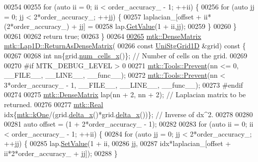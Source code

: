 \begin{DoxyCode}
00254 
00255   \textcolor{keywordflow}{for} (\textcolor{keyword}{auto} ii = 0; ii < order\_accuracy\_ - 1; ++ii) \{
00256     \textcolor{keywordflow}{for} (\textcolor{keyword}{auto} jj = 0; jj < 2*order\_accuracy\_; ++jj) \{
00257       laplacian\_[offset + ii*(2*order\_accuracy\_) + jj] =
00258         lap.\hyperlink{classmtk_1_1DenseMatrix_a87fb785713c04b13767947cc3325ce7c}{GetValue}(1 + ii,jj);
00259     \}
00260   \}
00261 
00262   \textcolor{keywordflow}{return} \textcolor{keyword}{true};
00263 \}
00264 
\hypertarget{mtk__lap__1d_8cc_source_l00265}{}\hyperlink{classmtk_1_1Lap1D_aaea34a17b0879e05eb4109645a2ba8f4}{00265} \hyperlink{classmtk_1_1DenseMatrix}{mtk::DenseMatrix} \hyperlink{classmtk_1_1Lap1D_aaea34a17b0879e05eb4109645a2ba8f4}{mtk::Lap1D::ReturnAsDenseMatrix}(
00266   \textcolor{keyword}{const} \hyperlink{classmtk_1_1UniStgGrid1D}{UniStgGrid1D} &grid)\textcolor{keyword}{ const }\{
00267 
00268   \textcolor{keywordtype}{int} nn\{grid.\hyperlink{classmtk_1_1UniStgGrid1D_af1b3729d8afa07be5b2775ed68015b80}{num\_cells\_x}()\};  \textcolor{comment}{// Number of cells on the grid.}
00269 
00270 \textcolor{preprocessor}{  #if MTK\_DEBUG\_LEVEL > 0}
00271   \hyperlink{classmtk_1_1Tools_afe5bb096309258e2e72503fd7b41c7e0}{mtk::Tools::Prevent}(nn <= 0, \_\_FILE\_\_, \_\_LINE\_\_, \_\_func\_\_);
00272   \hyperlink{classmtk_1_1Tools_afe5bb096309258e2e72503fd7b41c7e0}{mtk::Tools::Prevent}(nn < 3*order\_accuracy\_ - 1, \_\_FILE\_\_, \_\_LINE\_\_, \_\_func\_\_);
00273 \textcolor{preprocessor}{  #endif}
00274 
00275   \hyperlink{classmtk_1_1DenseMatrix}{mtk::DenseMatrix} lap(nn + 2, nn + 2); \textcolor{comment}{// Laplacian matrix to be returned.}
00276 
00277   \hyperlink{group__c01-roots_gac080bbbf5cbb5502c9f00405f894857d}{mtk::Real} idx\{\hyperlink{group__c01-roots_ga26407c24d43b6b95480943340d285c71}{mtk::kOne}/(grid.\hyperlink{classmtk_1_1UniStgGrid1D_a6e7173b01241632cf509496d66b9f74c}{delta\_x}()*grid.\hyperlink{classmtk_1_1UniStgGrid1D_a6e7173b01241632cf509496d66b9f74c}{delta\_x}())\}; \textcolor{comment}{// Inverse of
       dx^2.}
00278 
00280 
00281   \textcolor{keyword}{auto} offset = (1 + 2*order\_accuracy\_ - 1);
00282 
00283   \textcolor{keywordflow}{for} (\textcolor{keyword}{auto} ii = 0; ii < order\_accuracy\_ - 1; ++ii) \{
00284     \textcolor{keywordflow}{for} (\textcolor{keyword}{auto} jj = 0; jj < 2*order\_accuracy\_; ++jj) \{
00285       lap.\hyperlink{classmtk_1_1DenseMatrix_ae0f873a6d3a734da467cafb817da64ae}{SetValue}(1 + ii,
00286                    jj,
00287                    idx*laplacian\_[offset + ii*2*order\_accuracy\_ + jj]);
00288     \}

\end{DoxyCode}
